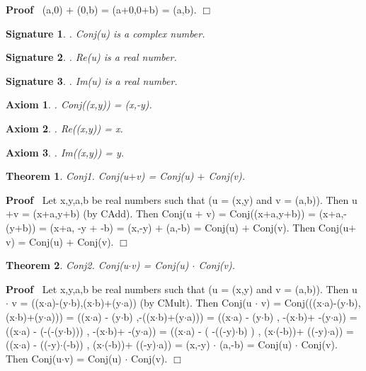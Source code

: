 \documentclass{article}
\newenvironment{forthel}{\begin{leftbar}}{\end{leftbar}}
\newenvironment{proof}{\noindent\textbf{Proof\ }}{\hspace*{\fill}$\Box$\medskip}
\newtheorem{axiom}{Axiom}
\newtheorem{theorem}{Theorem}
\newtheorem{signature}{Signature}
\newcommand{\cmul}{\cdot}
\newcommand{\cadd}{+}
\begin{document}
\begin{forthel}
\begin{proof}
(a,0) $\cadd$ (0,b)
= (a+0,0+b) 
= (a,b).
\end{proof}



\begin{signature}. Conj(u) is a complex number.

\end{signature}
\begin{signature}. Re(u) is a real number.

\end{signature}
\begin{signature}. Im(u) is a real number.

\end{signature}
\begin{axiom}. Conj((x,y)) = (x,-y).

\end{axiom}
\begin{axiom}. Re((x,y)) = x.

\end{axiom}
\begin{axiom}. Im((x,y)) = y.

\end{axiom}

\begin{theorem}
 Conj1. Conj(u$\cadd$v) = Conj(u) $\cadd$ Conj(v).
\end{theorem}\begin{proof}
 	Let x,y,a,b be real numbers such that (u = (x,y) and v = (a,b)).
Then u$\cadd$v = (x+a,y+b) (by CAdd).
Then Conj(u $\cadd$ v) = Conj((x+a,y+b)) = (x+a,-(y+b)) = (x+a, -y + -b) = (x,-y) $\cadd$ (a,-b) = Conj(u) $\cadd$ Conj(v).
Then Conj(u$\cadd$v) = Conj(u) $\cadd$ Conj(v).
\end{proof}
		
\begin{theorem}
 Conj2. Conj(u$\cmul$v) = Conj(u) $\cmul$ Conj(v).
\end{theorem}\begin{proof}
 	Let x,y,a,b be real numbers such that (u = (x,y) and v = (a,b)).
Then u $\cmul$ v = ((x$\cdot$a)-(y$\cdot$b),(x$\cdot$b)+(y$\cdot$a)) (by CMult).
Then Conj(u $\cmul$ v) 	= Conj(((x$\cdot$a)-(y$\cdot$b),(x$\cdot$b)+(y$\cdot$a))) 
= ((x$\cdot$a) - (y$\cdot$b)       ,-((x$\cdot$b)+(y$\cdot$a))) 
= ((x$\cdot$a) - (y$\cdot$b)       , -(x$\cdot$b)+ -(y$\cdot$a))
= ((x$\cdot$a) - (-(-(y$\cdot$b))) , -(x$\cdot$b)+ -(y$\cdot$a))
= ((x$\cdot$a) - ( -((-y)$\cdot$b) ) , (x$\cdot$(-b))+ ((-y)$\cdot$a))
= ((x$\cdot$a) - ((-y)$\cdot$(-b)) , (x$\cdot$(-b))+ ((-y)$\cdot$a))
= (x,-y) $\cmul$ (a,-b)
= Conj(u) $\cmul$ Conj(v). 
Then Conj(u$\cmul$v) = Conj(u) $\cmul$ Conj(v).
\end{proof}



\end{forthel}
\end{document}
